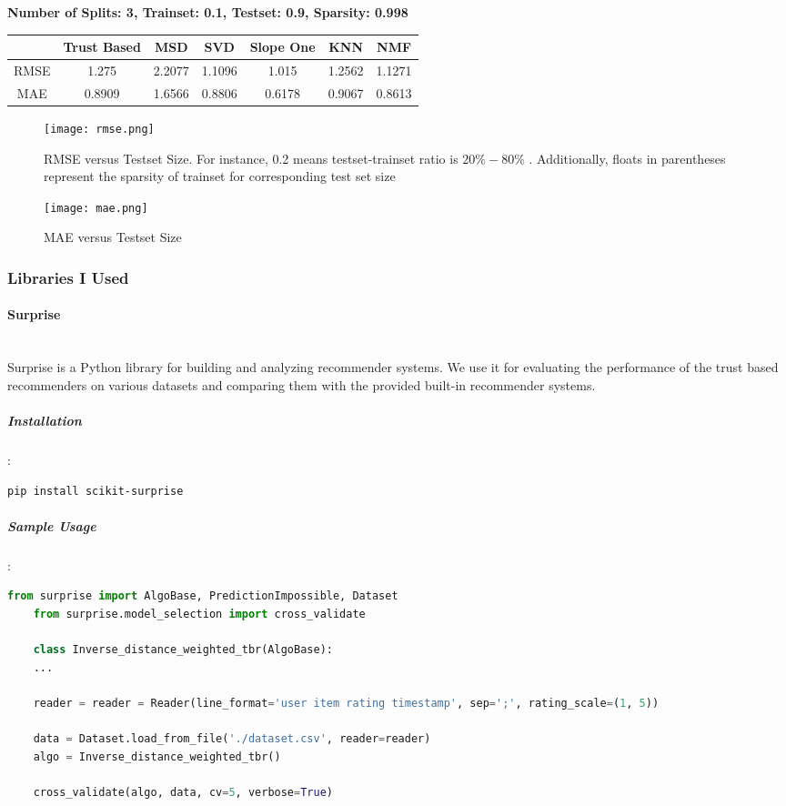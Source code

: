 	\vspace{1cm}
	\textbf{Number of Splits: 3, Trainset: 0.1, Testset: 0.9, Sparsity: 0.998}
	\begin{center}
		\begin{tabular}{ | c | c | c | c | c | c | c |}
			\hline
			& Trust Based & MSD & SVD & Slope One & KNN & NMF\\ 
			\hline
			RMSE& 1.275& 2.2077& 1.1096&1.015 & 1.2562& 1.1271\\
			\hline
			MAE& 0.8909 &1.6566 & 0.8806&0.6178 & 0.9067&0.8613\\
			\hline
		\end{tabular}
	\end{center} 

\begin{figure}[H]
	\centering
	\texttt{[image: rmse.png]}
	\caption{RMSE versus Testset Size. For instance, 0.2 means testset-trainset ratio is $20\%-80\%$ . Additionally, floats in parentheses represent the sparsity of trainset for corresponding test set size}
	\label{fig:rmse}
\end{figure}

\begin{figure}[H]
	\centering
	\texttt{[image: mae.png]}
	\caption{MAE versus Testset Size}
	\label{fig:mae}
\end{figure}
	
	\subsubsection{Libraries I Used}
	\paragraph{Surprise \cite{Surprise}} \mbox{} \\
	Surprise is a Python library for building and analyzing recommender systems. We use it for evaluating the performance of the trust based recommenders on various datasets and comparing them with the provided built-in recommender systems.
	\label{surprise}
	\subparagraph{Installation}:
	\begin{lstlisting}[language=bash]
	pip install scikit-surprise
	\end{lstlisting}
	
	\subparagraph{Sample Usage}:
	\begin{lstlisting}[language=python, caption=Surprise example]
	from surprise import AlgoBase, PredictionImpossible, Dataset
	from surprise.model_selection import cross_validate
	
	class Inverse_distance_weighted_tbr(AlgoBase):
	...
	
	reader = reader = Reader(line_format='user item rating timestamp', sep=';', rating_scale=(1, 5))
	
	data = Dataset.load_from_file('./dataset.csv', reader=reader)
	algo = Inverse_distance_weighted_tbr()
	
	cross_validate(algo, data, cv=5, verbose=True)
	\end{lstlisting}
	
